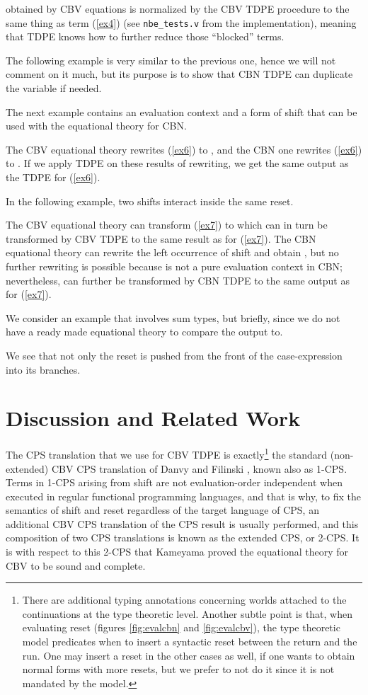 \documentclass{eptcs}
\theoremstyle{definition}
\theoremstyle{plain}
\theoremstyle{remark}
\begin{document}
obtained by CBV equations is normalized by the CBV TDPE procedure to the same thing as term (\ref{ex4}) (see \texttt{nbe\_tests.v} from the implementation), meaning that TDPE knows how to further reduce those ``blocked'' terms.

The following example is very similar to the previous one, hence we will not comment on it much, but its purpose is to show that CBN TDPE can duplicate the variable  if needed.


The next example contains an evaluation context and a form of shift that can be used with the equational theory for CBN.

The CBV equational theory rewrites (\ref{ex6}) to , and the CBN one rewrites (\ref{ex6}) to . If we apply TDPE on these results of rewriting, we get the same output as the TDPE for (\ref{ex6}).


In the following example, two shifts interact inside the same reset.

The CBV equational theory can transform (\ref{ex7}) to  which can in turn be transformed by CBV TDPE to the same result as for (\ref{ex7}). The CBN equational theory can rewrite the left occurrence of shift and obtain , but no further rewriting is possible because  is not a pure evaluation context in CBN; nevertheless,  can further be transformed by CBN TDPE to the same output as for (\ref{ex7}).

We consider an example that involves sum types, but briefly, since we do not have a ready made equational theory to compare the output to.

We see that not only the reset is pushed from the front of the case-expression into its branches. 

\section{Discussion and Related Work}\label{sec:conclusion}

The CPS translation that we use for CBV TDPE is exactly\footnote{There are additional typing annotations concerning worlds attached to the continuations at the type theoretic level. Another subtle point is that, when evaluating reset (figures \ref{fig:evalcbn} and \ref{fig:evalcbv}), the type theoretic model predicates when to insert a syntactic reset between the return and the run. One may insert a reset in the other cases as well, if one wants to obtain normal forms with more resets, but we prefer to not do it since it is not mandated by the model.} the standard (non-extended) CBV CPS translation of Danvy and Filinski \cite{DanvyF1990}, known also as 1-CPS. Terms in 1-CPS arising from shift are not evaluation-order independent when executed in regular functional programming languages, and that is why, to fix the semantics of shift and reset regardless of the target language of CPS, an additional CBV CPS translation of the CPS result is usually performed, and this composition of two CPS translations is known as the extended CPS, or 2-CPS. It is with respect to this 2-CPS that Kameyama \cite{Kameyama2007} proved the equational theory for CBV to be sound and complete.
\end{document}

